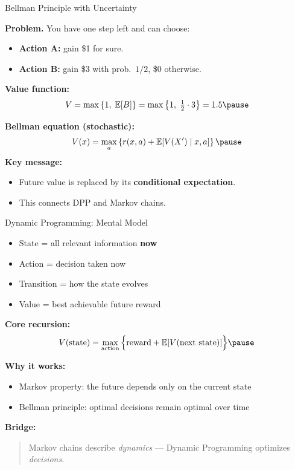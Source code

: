 \documentclass[aspectratio=169]{beamer}
\begin{document}
\begin{frame}{Bellman Principle with Uncertainty}

\textbf{Problem.}
You have one step left and can choose: \pause
\begin{itemize}
  \item \textbf{Action A:} gain \$1 for sure.\pause
  \item \textbf{Action B:} gain \$3 with prob.\ $1/2$, \$0 otherwise.\pause
\end{itemize}

\medskip
\textbf{Value function:}
\[
V = \max \left\{
1,\;
\mathbb{E}[B]
\right\}
=
\max\left\{1,\; \tfrac12\cdot3\right\}
=1.5\pause
\]

\medskip
\textbf{Bellman equation (stochastic):}
\[
V(x) = \max_a \left\{ r(x,a) + \mathbb{E}[V(X')\mid x,a] \right\}\pause
\vspace{-3mm}
\]
\textbf{Key message:}
\begin{itemize}
  \item Future value is replaced by its \textbf{conditional expectation}.\pause
  \item This connects DPP and Markov chains.
\end{itemize}

\end{frame}

\begin{frame}{Dynamic Programming: Mental Model}

\begin{itemize}
  \item State = all relevant information \textbf{now}\pause
  \item Action = decision taken now\pause
  \item Transition = how the state evolves\pause
  \item Value = best achievable future reward\pause
\end{itemize}

\medskip
\textbf{Core recursion:}
\[
V(\text{state})
=
\max_{\text{action}}
\Big\{
\text{reward}
+
\mathbb{E}[V(\text{next state})]
\Big\}
\vspace{-5mm}\pause
\]

\medskip
\textbf{Why it works:}
\begin{itemize}
  \item Markov property: the future depends only on the current state\pause
  \item Bellman principle: optimal decisions remain optimal over time\pause
\end{itemize}

\medskip
\textbf{Bridge:}
\begin{quote}
Markov chains describe \emph{dynamics} —  
Dynamic Programming optimizes \emph{decisions}.
\end{quote}

\end{frame}
\end{document}

